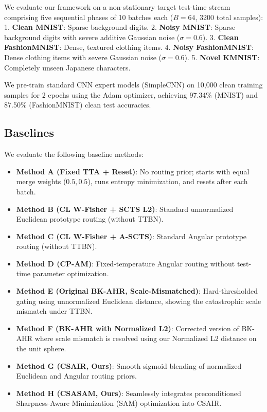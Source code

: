 \documentclass{article}
\theoremstyle{plain}
\theoremstyle{definition}
\theoremstyle{remark}
\begin{document}
We evaluate our framework on a non-stationary target test-time stream comprising five sequential phases of 10 batches each ($B=64$, 3200 total samples):
1. \textbf{Clean MNIST}: Sparse background digits.
2. \textbf{Noisy MNIST}: Sparse background digits with severe additive Gaussian noise ($\sigma=0.6$).
3. \textbf{Clean FashionMNIST}: Dense, textured clothing items.
4. \textbf{Noisy FashionMNIST}: Dense clothing items with severe Gaussian noise ($\sigma=0.6$).
5. \textbf{Novel KMNIST}: Completely unseen Japanese characters.

We pre-train standard CNN expert models (SimpleCNN) on 10,000 clean training samples for 2 epochs using the Adam optimizer, achieving 97.34\% (MNIST) and 87.50\% (FashionMNIST) clean test accuracies.

\subsection{Baselines}

We evaluate the following baseline methods:
\begin{itemize}
    \item \textbf{Method A (Fixed TTA + Reset)}: No routing prior; starts with equal merge weights ($0.5, 0.5$), runs entropy minimization, and resets after each batch.
    \item \textbf{Method B (CL W-Fisher + SCTS L2)}: Standard unnormalized Euclidean prototype routing (without TTBN).
    \item \textbf{Method C (CL W-Fisher + A-SCTS)}: Standard Angular prototype routing (without TTBN).
    \item \textbf{Method D (CP-AM)}: Fixed-temperature Angular routing without test-time parameter optimization.
    \item \textbf{Method E (Original BK-AHR, Scale-Mismatched)}: Hard-thresholded gating using unnormalized Euclidean distance, showing the catastrophic scale mismatch under TTBN.
    \item \textbf{Method F (BK-AHR with Normalized L2)}: Corrected version of BK-AHR where scale mismatch is resolved using our Normalized L2 distance on the unit sphere.
    \item \textbf{Method G (CSAIR, Ours)}: Smooth sigmoid blending of normalized Euclidean and Angular routing priors.
    \item \textbf{Method H (CSASAM, Ours)}: Seamlessly integrates preconditioned Sharpness-Aware Minimization (SAM) optimization into CSAIR.
\end{itemize}
\end{document}
